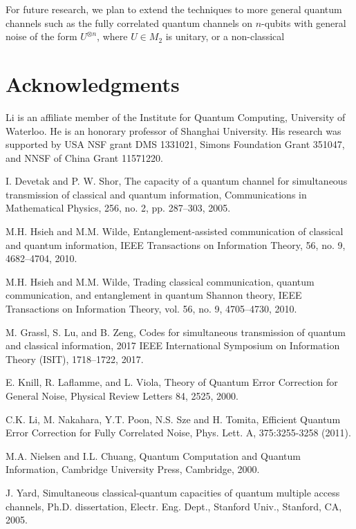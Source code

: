 \documentclass[11pt]{article}
\begin{document}
 

\medskip
For future research, we plan to extend the techniques to more general quantum channels 
such as the fully correlated quantum channels on $n$-qubits
with general noise of the form $U^{\otimes n}$, where $U \in M_2$
is unitary, or a non-classical 

\section*{Acknowledgments}


Li is an affiliate member of the Institute for Quantum Computing,
University of Waterloo. He is an honorary professor of Shanghai
University. His research was supported by USA NSF grant DMS 1331021,
Simons Foundation Grant 351047, and NNSF of China Grant 11571220. 


\begin{thebibliography}{WWW}


 I. Devetak and P. W. Shor,  The capacity of a quantum channel
for simultaneous transmission of classical and quantum information, 
Communications in Mathematical Physics,  256, no. 2, pp. 287–303,
2005.



  M.H. Hsieh  and M.M. Wilde,  Entanglement-assisted communication of classical and quantum information, IEEE Transactions on Information Theory, 56, no. 9, 4682--4704, 2010.

 M.H. Hsieh  and M.M. Wilde,  Trading classical communication, quantum communication, and entanglement in quantum Shannon theory, IEEE Transactions on Information
Theory, vol. 56, no. 9,   4705--4730,   2010.


 M. Grassl, S. Lu, and B. Zeng, Codes for simultaneous transmission of quantum and 
classical information, 
2017 IEEE International Symposium on Information Theory (ISIT),  1718--1722, 2017.


E. Knill, R. Laflamme, and L. Viola, 
Theory of Quantum Error Correction for General Noise,
Physical Review
Letters 84, 2525, 2000.

 C.K. Li, M. Nakahara, Y.T. Poon, N.S. Sze and H. Tomita,
Efficient Quantum Error Correction for Fully Correlated Noise, 
Phys. Lett. A, 375:3255-3258 (2011).

 M.A. Nielsen and I.L. Chuang,
Quantum Computation and Quantum Information, 
Cambridge University Press, Cambridge, 2000.

 J. Yard,  Simultaneous classical-quantum capacities of quantum multiple
access channels,  Ph.D. dissertation, Electr. Eng. Dept., Stanford
Univ., Stanford, CA, 2005.
 

\end{thebibliography}
\end{document}
